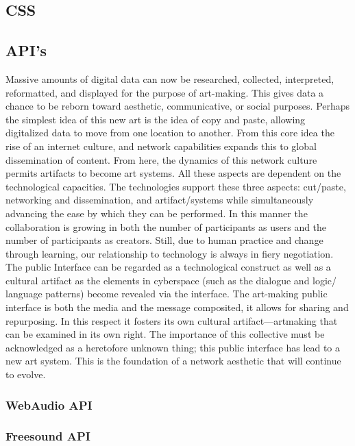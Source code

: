 \subsection{CSS}

\subsection{API's}
\begin{citacao}
Massive amounts of digital data can now be researched, collected, interpreted, reformatted, and displayed for the purpose of art-making. This gives data a chance to be reborn toward aesthetic, communicative, or social purposes. Perhaps the simplest idea of this new art is the idea of copy and paste, allowing digitalized data to move from one location to another. From this core idea the rise of an internet culture, and network capabilities expands this to global dissemination of content. From here, the dynamics of this network culture permits artifacts to become art systems. All these aspects are dependent on the technological capacities. The technologies support these three aspects: cut/paste, networking and dissemination, and artifact/systems while simultaneously advancing the ease by which they can be performed. In this manner the collaboration is growing in both the number of participants as users and the number of participants as creators. Still, due to human practice and change through learning, our relationship to technology is always in fiery negotiation. The public Interface can be regarded as a technological construct as well as a cultural artifact as the elements in cyberspace (such as the dialogue and logic/ language patterns) become revealed via the interface. The art-making public interface is both the media and the message composited, it allows for sharing and repurposing. In this respect it fosters its own cultural artifact—artmaking that can be examined in its own right. The importance of this collective must be acknowledged as a heretofore unknown thing; this public interface has lead to a new art system. This is the foundation of a network aesthetic that will continue to evolve.
\cite[5]{Soon2011}
\end{citacao}

\subsubsection{WebAudio API}

\subsubsection{Freesound API}

